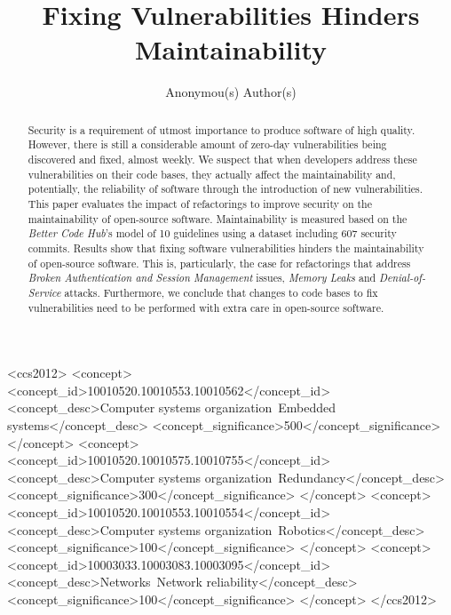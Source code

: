\documentclass[sigconf,review]{acmart}
\begin{document}
\title{Fixing Vulnerabilities Hinders Maintainability}

\author{
    Anonymou(s) Author(s)
}

\renewcommand{\shortauthors}{Reis et al.}

\begin{abstract}
Security is a requirement of utmost importance to produce software of high
quality. However, there is still a considerable amount of zero-day
vulnerabilities being discovered and fixed, almost weekly. We suspect that 
when developers address these vulnerabilities on their code bases, they actually
affect the maintainability and, potentially, the reliability of software through the
introduction of new vulnerabilities. This paper evaluates the impact 
of refactorings to improve security on the maintainability of open-source software. 
Maintainability is measured based on the \emph{Better Code Hub}'s model of 10 guidelines 
using a dataset including 607 security commits. Results show that fixing software
vulnerabilities hinders the maintainability of open-source software. This is,
particularly, the case for refactorings that address \emph{Broken Authentication
and Session Management} issues, \emph{Memory Leaks} and \emph{Denial-of-Service}
attacks. Furthermore, we conclude that changes to code bases to fix vulnerabilities
need to be performed with extra care in open-source software.
\end{abstract}



\begin{CCSXML}
<ccs2012>
 <concept>
  <concept_id>10010520.10010553.10010562</concept_id>
  <concept_desc>Computer systems organization~Embedded systems</concept_desc>
  <concept_significance>500</concept_significance>
 </concept>
 <concept>
  <concept_id>10010520.10010575.10010755</concept_id>
  <concept_desc>Computer systems organization~Redundancy</concept_desc>
  <concept_significance>300</concept_significance>
 </concept>
 <concept>
  <concept_id>10010520.10010553.10010554</concept_id>
  <concept_desc>Computer systems organization~Robotics</concept_desc>
  <concept_significance>100</concept_significance>
 </concept>
 <concept>
  <concept_id>10003033.10003083.10003095</concept_id>
  <concept_desc>Networks~Network reliability</concept_desc>
  <concept_significance>100</concept_significance>
 </concept>
</ccs2012>
\end{CCSXML}
\end{document}

